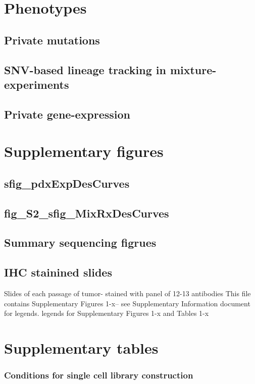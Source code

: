 \documentclass{article}
\begin{document}
\section{Phenotypes}
\subsection{Private mutations}
\subsection{SNV-based lineage tracking in mixture-experiments}
\subsection{Private gene-expression}





\section{Supplementary figures}
\subsection{sfig_pdxExpDesCurves}
\subsection{fig_S2_sfig_MixRxDesCurves}
\subsection{Summary sequencing figrues}


\subsection{IHC stainined slides}
Slides of each passage of tumor- stained with panel of 12-13 antibodies
This file contains Supplementary Figures 1-x– see Supplementary Information document for legends.
legends for Supplementary Figures 1-x and Tables 1-x

\section{Supplementary tables}
\subsubsection{Conditions for single cell library construction}
\end{document}
